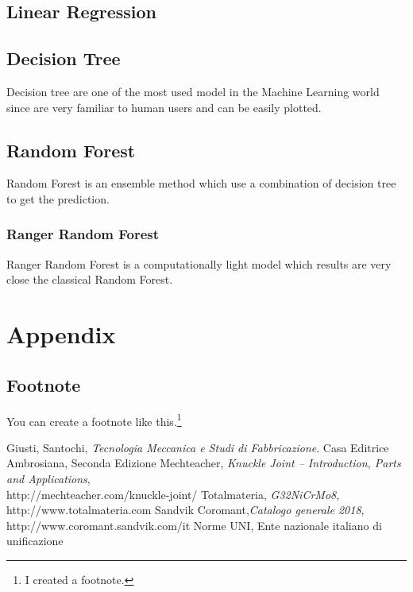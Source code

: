 \documentclass{FR16}
\begin{document}
\subsection{Linear Regression}


\subsection{Decision Tree}
Decision  tree are one of the most used model in the Machine Learning world since are very familiar to human users and can be easily plotted. 
\\



\subsection{Random Forest}
Random Forest is an ensemble method which use a combination of decision tree to get the prediction.
\subsubsection{Ranger Random Forest}
Ranger Random Forest is a computationally light model which results are very close the classical Random Forest.
\\





\newpage
\section{Appendix}
%


%

\newpage


\subsection{Footnote}
You can create a footnote like this.\footnote{I created a footnote.}



\newpage
\begin{thebibliography}{9}
Giusti, Santochi, \emph{Tecnologia Meccanica e Studi di Fabbricazione}. Casa Editrice Ambrosiana, Seconda Edizione
Mechteacher, \emph{Knuckle Joint – Introduction, Parts and Applications},\\ http://mechteacher.com/knuckle-joint/
Totalmateria, \emph{G32NiCrMo8}, http://www.totalmateria.com 
Sandvik Coromant,\emph{Catalogo  generale  2018},   http://www.coromant.sandvik.com/it
Norme UNI, Ente nazionale italiano di unificazione
\end{thebibliography}
\end{document}
